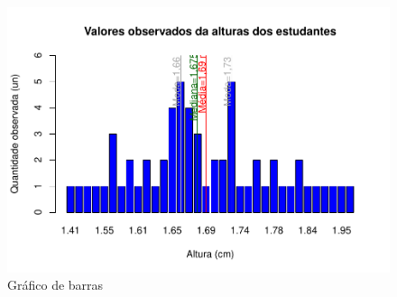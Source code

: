 \documentclass[
]{book}
\begin{document}
\begin{figure}
\centering
\includegraphics{apostila_files/figure-latex/unnamed-chunk-43-1.pdf}
\caption{\label{fig:unnamed-chunk-43}Gráfico de barras}
\end{figure}

\hfill\break
\end{document}
